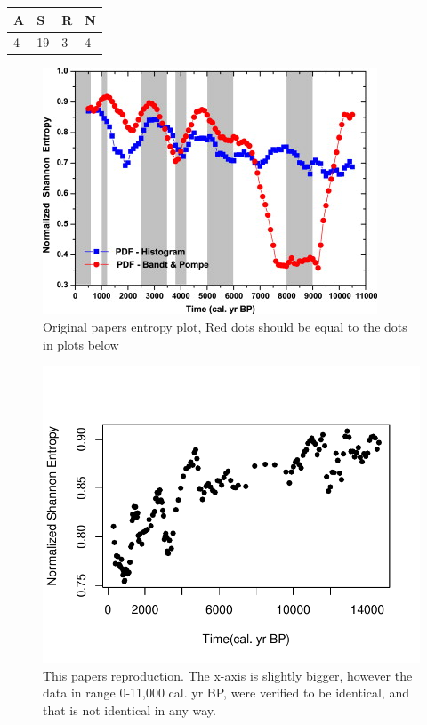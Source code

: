 \begin{table}[]
\begin{tabular}{|l|l|l|l|}
\hline
A & S  & R & N \\ \hline
4 & 19 & 3 & 4 \\ \hline
\end{tabular}
\end{table}

\begin{figure}
    \centering
    \includegraphics[width=\textwidth,keepaspectratio]{ElNino/ArticleEntropyPlot.jpg}
    \caption{Original papers entropy plot, Red dots should be equal to the dots in plots below}
\end{figure}

\begin{figure}
    \centering
    \includegraphics[width=\textwidth,keepaspectratio]{ElNino/Entropy.pdf}
    \caption{This papers reproduction. The x-axis is slightly bigger, however the data in range 0-11,000 cal. yr BP, were verified to be identical, and that is not identical in any way.}
\end{figure}